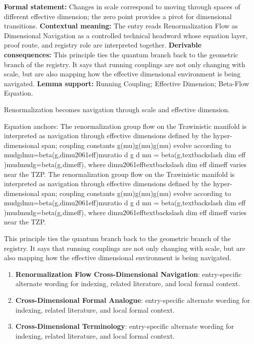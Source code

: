\begingroup\footnotesize\setlength{\emergencystretch}{3em}\sloppy
\textbf{Formal statement:} Changes in scale correspond to moving through spaces of different effective dimension; the zero point provides a pivot for dimensional transitions. \textbf{Contextual meaning:} The entry reads Renormalization Flow as Dimensional Navigation as a controlled technical headword whose equation layer, proof route, and registry role are interpreted together. \textbf{Derivable consequences:} This principle ties the quantum branch back to the geometric branch of the registry. It says that running couplings are not only changing with scale, but are also mapping how the effective dimensional environment is being navigated. \textbf{Lemma support:} Running Coupling; Effective Dimension; Beta-Flow Equation.\par
\endgroup

Renormalization becomes navigation through scale and effective dimension.

Equation anchors: The renormalization group flow on the Trawinistic manifold is interpreted as navigation through effective dimensions defined by the hyper-dimensional span; coupling constants g(mu)g(mu)g(mu) evolve according to mudgdmu=beta(g,dimu2061eff)muratio d g d mu = beta(g,textbackslash dim eff )mudmudg=beta(g,dimeff), where dimu2061efftextbackslash dim eff dimeff varies near the TZP. The renormalization group flow on the Trawinistic manifold is interpreted as navigation through effective dimensions defined by the hyper-dimensional span; coupling constants g(mu)g(mu)g(mu) evolve according to mudgdmu=beta(g,dimu2061eff)muratio d g d mu = beta(g,textbackslash dim eff )mudmudg=beta(g,dimeff), where dimu2061efftextbackslash dim eff dimeff varies near the TZP.

This principle ties the quantum branch back to the geometric branch of the registry. It says that running couplings are not only changing with scale, but are also mapping how the effective dimensional environment is being navigated.
\endgroup

\begingroup\footnotesize\sloppy
\begin{enumerate}[leftmargin=1.35em,itemsep=1pt,topsep=1pt,parsep=0pt]
\item \textbf{Renormalization Flow Cross-Dimensional Navigation}: entry-specific alternate wording for indexing, related literature, and local formal context.
\item \textbf{Cross-Dimensional Formal Analogue}: entry-specific alternate wording for indexing, related literature, and local formal context.
\item \textbf{Cross-Dimensional Terminology}: entry-specific alternate wording for indexing, related literature, and local formal context.
\end{enumerate}
\endgroup

